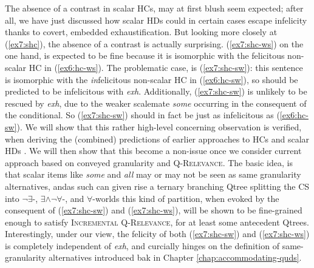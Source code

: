 

\begin{exe}
	\ex\label{ex7:shc}
	\begin{xlist}
		\label{ex7:shc-sw}
		\label{ex7:shc-ws}
	\end{xlist}
\end{exe}


The absence of a contrast in scalar HCs, may at first blush seem expected; after all, we have just discussed how scalar HDs could  in certain cases escape infelicity thanks to covert, embedded exhaustification. But looking more closely at (\ref{ex7:shc}), the absence of a contrast is actually surprising. (\ref{ex7:shc-ws}) on the one hand, is expected to be fine because it is isomorphic with the felicitous non-scalar HC in (\ref{ex6:hc-ws}). The problematic case, is (\ref{ex7:shc-sw}): this sentence is isomorphic with the \textit{in}felicitous non-scalar HC in (\ref{ex6:hc-sw}), so should be predicted to be infelicitous with \textit{exh}. Additionally, (\ref{ex7:shc-sw}) is unlikely to be rescued by \textit{exh}, due to the weaker scalemate \textit{some} occurring in the consequent of the conditional. So (\ref{ex7:shc-sw}) should in fact be just as infelicitous as (\ref{ex6:hc-sw}). We will show that this rather high-level concerning observation is verified, when deriving the (combined) predictions of earlier approaches to HCs \parencite{Kalomoiros2024} and scalar HDs \parencite{Fox2018}. We will then show that this become a non-issue once we consider current approach based on conveyed granularity and \textsc{Q-Relevance}. The basic idea, is that scalar items like \textit{some} and \textit{all} may or may not be seen as same granularity alternatives, andas such can given rise a ternary branching Qtree splitting the CS into $\neg\exists$-, $\exists\wedge\neg\forall$-, and $\forall$-worlds this kind of partition, when evoked by the consequent of (\ref{ex7:shc-sw}) and (\ref{ex7:shc-ws}), will be shown to be fine-grained enough to satisfy \textsc{Incremental Q-Relevance}, for at least some antecedent Qtrees. Interestingly, under our view, the felicity of both (\ref{ex7:shc-sw}) and (\ref{ex7:shc-ws}) is completely independent of \textit{exh}, and curcially hinges on the definition of same-granularity alternatives introduced bak in Chapter \ref{chap:accommodating-quds}.

